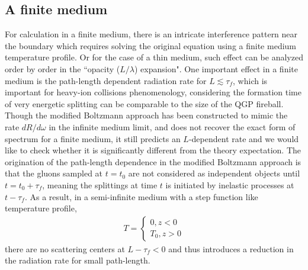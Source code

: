 \documentclass[aps, prc, reprint, amsmath, groupedaddress, nofootinbib]{revtex4-1}
\begin{document}
\subsection{A finite medium}
For calculation in a finite medium, there is an intricate interference pattern near the boundary which requires solving the original equation using a finite medium temperature profile. 
Or for the case of a thin medium, such effect can be analyzed order by order in the ``opacity ($L/\lambda$) expansion". 
One important effect in a finite medium is the path-length dependent radiation rate for $L \lesssim \tau_f$, which is important for heavy-ion collisions phenomenology, considering the formation time of very energetic splitting can be comparable to the size of the QGP fireball.
Though the modified Boltzmann approach has been constructed to mimic the rate $dR/d\omega$ in the infinite medium limit, and does not recover the exact form of spectrum for a finite medium, it still predicts an $L$-dependent rate and we would like to check whether it is significantly different from the theory expectation.
The origination of the path-length dependence in the modified Boltzmann approach is that the gluons sampled at $t=t_0$ are not considered as independent objects until $t = t_0+\tau_f$, meaning the splittings at time $t$ is initiated by inelastic processes at $t-\tau_f$.
As a result, in a semi-infinite medium with a step function like temperature profile, 
\begin{eqnarray}
T = \begin{cases}
0 , z<0\\
T_0, z>0
\end{cases}
\end{eqnarray}
there are no scattering centers at $L-\tau_f<0$ and thus introduces a reduction in the radiation rate for small path-length.
\end{document}
